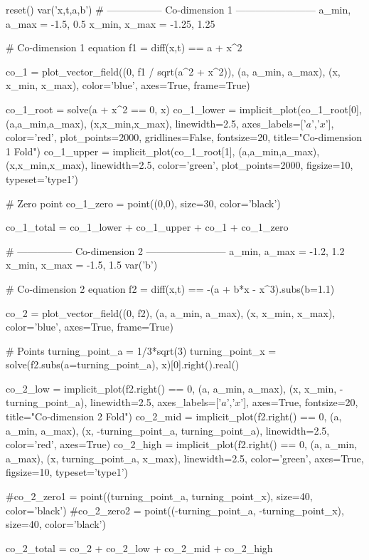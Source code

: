 \begin{sagesilent}
	reset()
	var('x,t,a,b')
		# ----------------- Co-dimension 1 ------------------------
	a_min, a_max = -1.5, 0.5
	x_min, x_max = -1.25, 1.25

	# Co-dimension 1 equation
	f1 = diff(x,t) == a + x^2

	co_1 = plot_vector_field((0, f1 / sqrt(a^2 + x^2)), (a, a_min, a_max), (x, x_min, x_max), color='blue', axes=True, frame=True)


	co_1_root = solve(a + x^2 == 0, x)
	co_1_lower = implicit_plot(co_1_root[0], (a,a_min,a_max), (x,x_min,x_max), linewidth=2.5, axes_labels=['$a$','$x$'], color='red', plot_points=2000, gridlines=False, fontsize=20, title="Co-dimension 1 Fold")
	co_1_upper = implicit_plot(co_1_root[1], (a,a_min,a_max), (x,x_min,x_max), linewidth=2.5, color='green', plot_points=2000, figsize=10, typeset='type1')

	# Zero point
	co_1_zero = point((0,0), size=30, color='black')

	co_1_total = co_1_lower + co_1_upper + co_1 + co_1_zero

	# ----------------- Co-dimension 2 ------------------------
	a_min, a_max = -1.2, 1.2
	x_min, x_max = -1.5, 1.5
	var('b')

	# Co-dimension 2 equation
	f2 = diff(x,t) == -(a + b*x - x^3).subs(b=1.1)

	co_2 = plot_vector_field((0, f2), (a, a_min, a_max), (x, x_min, x_max), color='blue', axes=True, frame=True)

	# Points
	turning_point_a = 1/3*sqrt(3)
	turning_point_x = solve(f2.subs(a=turning_point_a), x)[0].right().real()

	co_2_low = implicit_plot(f2.right() == 0, (a, a_min, a_max), (x, x_min, -turning_point_a), linewidth=2.5, axes_labels=['$a$','$x$'], axes=True, fontsize=20, title="Co-dimension 2 Fold")
	co_2_mid = implicit_plot(f2.right() == 0, (a, a_min, a_max), (x, -turning_point_a, turning_point_a), linewidth=2.5, color='red', axes=True)
	co_2_high = implicit_plot(f2.right() == 0, (a, a_min, a_max), (x, turning_point_a, x_max), linewidth=2.5, color='green', axes=True, figsize=10, typeset='type1')

	#co_2_zero1 = point((turning_point_a, turning_point_x), size=40, color='black')
	#co_2_zero2 = point((-turning_point_a, -turning_point_x), size=40, color='black')

	co_2_total = co_2 + co_2_low + co_2_mid + co_2_high
\end{sagesilent}

